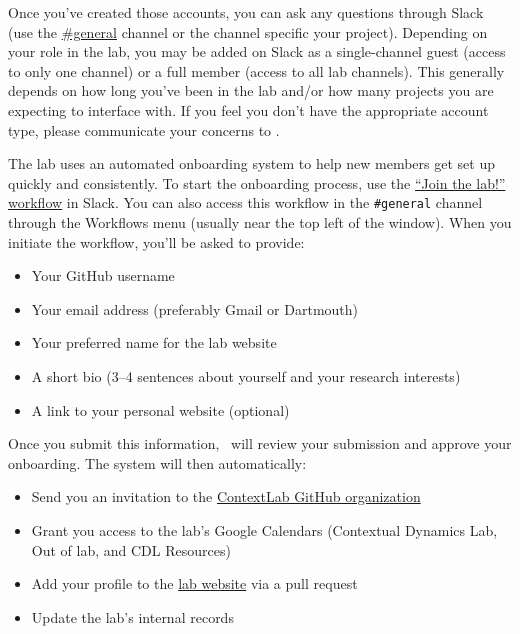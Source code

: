 \documentclass{tufte-book} %
\begin{document}
Once you've created those accounts, you can ask any questions through
Slack (use the
\href{https://context-lab.slack.com/messages/general/}{\#general}
channel or the channel specific your project).  Depending on your role
in the lab, you may be added on Slack as a single-channel guest
(access to only one channel) or a full member (access to all lab
channels).  This generally depends on how long you've been in the lab
and/or how many projects you are expecting to interface with.  If you
feel you don't have the appropriate account type, please communicate
your concerns to \director.

\label{sec:onboarding}

\noindent The lab uses an automated onboarding system to help new members get set up quickly and consistently. To start the onboarding process, use the \href{https://slack.com/shortcuts/Ft07ESC6CP3J/b1531b6fe100db8522fbd05c6a49ef63}{``Join the lab!'' workflow} in Slack.  You can also access this workflow in the \texttt{\#general} channel through the Workflows menu (usually near the top left of the window).  When you initiate the workflow, you'll be asked to provide:
\begin{itemize}
\item Your GitHub username
\item Your email address (preferably Gmail or Dartmouth)
\item Your preferred name for the lab website
\item A short bio (3--4 sentences about yourself and your research interests)
\item A link to your personal website (optional)
\end{itemize}


Once you submit this information, \director~will review your submission and approve your onboarding. The system will then automatically:
\begin{itemize}
\item Send you an invitation to the \href{https://github.com/ContextLab}{ContextLab GitHub organization}
\item Grant you access to the lab's Google Calendars (Contextual Dynamics Lab, Out of lab, and CDL Resources)
\item Add your profile to the \href{https://contextlab.github.io}{lab website} via a pull request
\item Update the lab's internal records
\end{itemize}
\end{document}
